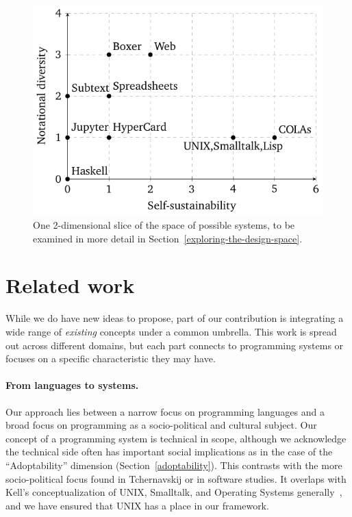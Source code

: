 \documentclass[english,submission]{programming}
\providecommand{\DIFadd}[1]{{\protect\color{blue}\uwave{#1}}} %
\providecommand{\DIFaddbegin}{} %
\providecommand{\DIFaddend}{} %
\begin{document}
\begin{figure}
  \centering
  \includegraphics[width=0.6\linewidth]{plot-figure0.pdf}
  \caption{One 2-dimensional slice of the space of possible systems, to be examined in more detail in Section\ \ref{exploring-the-design-space}.\label{fig:tech-dims-diagram}}
\end{figure}

\hypertarget{related-work}{%
\section{Related work}\label{related-work}}

While we do have new ideas to propose, part of our contribution is
integrating a wide range of \emph{existing} concepts under a common
umbrella. This work is spread out across different domains, but each
part connects to programming systems or focuses on a specific
characteristic they may have.

\paragraph{From languages to systems.}

Our approach lies between a narrow focus on programming languages and a
broad focus on programming as a socio-political and cultural subject.
Our concept of a programming system is technical in scope, although we
acknowledge the technical side often has important social implications
as in the case of the ``Adoptability'' dimension
(Section~\ref{adoptability}). This contrasts with the more
socio-political focus found in Tchernavskij\DIFaddbegin \DIFadd{~}\DIFaddend \cite{TcherDiss} or in
software studies\DIFaddbegin \DIFadd{~}\DIFaddend \cite{SwStudies}. It overlaps with Kell's
conceptualization of UNIX, Smalltalk, and Operating Systems
generally~\cite{KellOS}, and we have ensured that UNIX has a place in
our framework.
\end{document}
